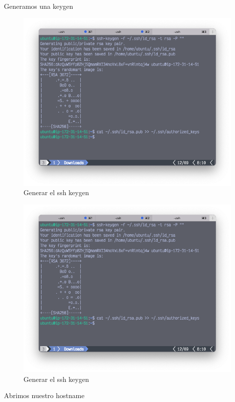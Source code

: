 Generamos una keygen
 \clearpage
\begin{figure}[h]
	\centering
	\includegraphics[scale=.35] {img/33-ssh-keygen}
	\caption{Generar el ssh keygen}
	\label{fig:33}	
\end{figure}

\begin{figure}[h]
	\centering
	\includegraphics[scale=.35] {img/33-ssh-keygen}
	\caption{Generar el ssh keygen}
	\label{fig:33}	
\end{figure}

Abrimos nuestro hostname
\clearpage

